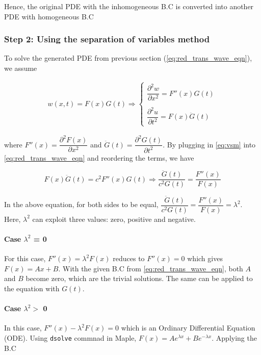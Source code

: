 \documentclass{article}
\begin{document}
Hence, the original PDE with the inhomogeneous B.C is converted into another PDE with homogeneous B.C

\subsubsection{Step 2: Using the separation of variables method}
To solve the generated PDE from previous section (\cref{eq:red_trans_wave_eqn}), we assume

\begin{equation}
\begin{matrix}
    w(x, t) = F(x) G(t) \Rightarrow \begin{cases}
        \dfrac{\partial^2 w}{\partial x^2} = F''(x) G(t) \\
        \\
        \dfrac{\partial^2 u}{\partial t^2} = F(x) \ddot{G}(t)
    \end{cases}
\end{matrix}
\label{eq:vsm}
\end{equation}

where $F''(x) = \dfrac{\partial^2 F(x)}{\partial x^2}$ and $\ddot{G}(t) = \dfrac{\partial^2 G(t)}{\partial t^2}$. By plugging in \cref{eq:vsm} into \cref{eq:red_trans_wave_eqn} and reordering the terms, we have

\begin{equation}
    F(x) \ddot{G}(t) = c^2 F''(x) G(t) \Rightarrow \dfrac{\ddot{G}(t)}{c^2 G(t)} = \dfrac{F''(x)}{F(x)}
\end{equation}

In the above equation, for both sides to be equal, $\dfrac{\ddot{G}(t)}{c^2 G(t)} = \dfrac{F''(x)}{F(x)} = \lambda^2$. Here, $\lambda^2$ can exploit three values: zero, positive and negative.

\paragraph{Case $\lambda^2$ = 0}
For this case, $F''(x) = \lambda^2 F(x)$ reduces to $F''(x) = 0$ which gives $F(x) = Ax + B$. With the given B.C from \cref{eq:red_trans_wave_eqn}, both $A$ and $B$ become zero, which are the trivial solutions. The same can be applied to the equation with $G(t)$.

\paragraph{Case $\lambda^2 >$ 0}
In this case, $F''(x) -\lambda^2 F(x) = 0$ which is an Ordinary Differential Equation (ODE). Using \texttt{dsolve} commnad in Maple, $F(x) = A e^{\lambda x} + B e^{-\lambda x}$. Applying the B.C 
\end{document}
